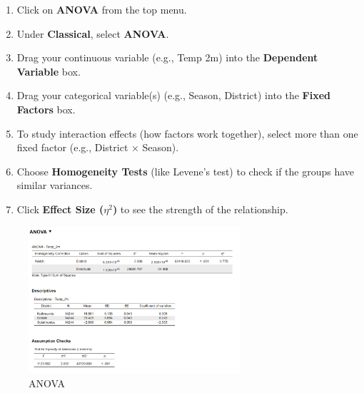 \begin{enumerate}
    \item Click on \textbf{ANOVA} from the top menu.
    \item Under \textbf{Classical}, select \textbf{ANOVA}.
    \item Drag your continuous variable (e.g., Temp 2m) into the \textbf{Dependent Variable} box.
    \item Drag your categorical variable(s) (e.g., Season, District) into the \textbf{Fixed Factors} box.
    \item To study interaction effects (how factors work together), select more than one fixed factor (e.g., District × Season).
    \item Choose \textbf{Homogeneity Tests} (like Levene’s test) to check if the groups have similar variances.
    \item Click \textbf{Effect Size ($\eta^2$)} to see the strength of the relationship.
\end{enumerate}

\begin{figure}[h]
\centering
\includegraphics[width=0.7\textwidth]{figures/ANOVA.png}
\caption{ANOVA}
\end{figure}

